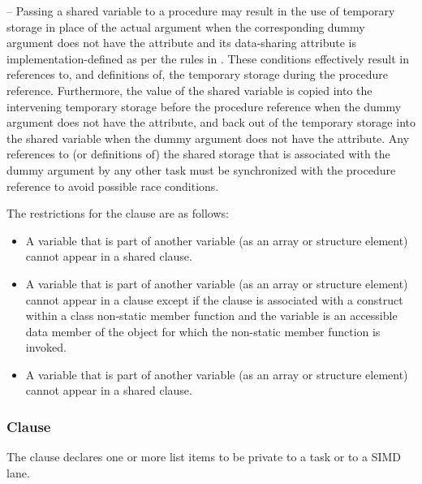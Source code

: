 {{{{\notestart
\noteheader – Passing a shared variable to a procedure may result in the use of
temporary storage in place of the actual argument when the corresponding dummy
argument does not have the  attribute and its data-sharing attribute
is implementation-defined as per the rules in
.  
These conditions effectively result in references to, and definitions of, the
temporary storage during the procedure reference.  Furthermore, the value of
the shared variable is copied into the intervening temporary storage before the procedure
reference when the dummy argument does not have the 
attribute, and back out of the temporary storage into the shared variable when
the dummy argument does not have the  attribute.  Any
references to (or definitions of) the shared storage that is associated with
the dummy argument by any other task must be synchronized with
the procedure reference to avoid possible race conditions.

\noteend
\medskip
\fortranspecificend


\restrictions
The restrictions for the  clause are as follows:
\begin{itemize}

\cspecificstart
\item A variable that is part of another variable (as an array or structure element) cannot appear in a shared clause.
\cspecificend

\cppspecificstart
\item A variable that is part of another variable (as an array or structure
  element) cannot appear in a  clause except if the 
  clause is associated with a construct within a class non-static member
  function and the variable is an accessible data member of the object for
  which the non-static member function is invoked.
\cppspecificend

\fortranspecificstart
\item A variable that is part of another variable (as an array or structure element) cannot appear in a shared clause.
\fortranspecificend

\end{itemize}







\subsubsection{ Clause}
\label{subsubsec:private clause}
\summary
The  clause declares one or more list items to be private to a task or to a 
SIMD lane.

}}}}
